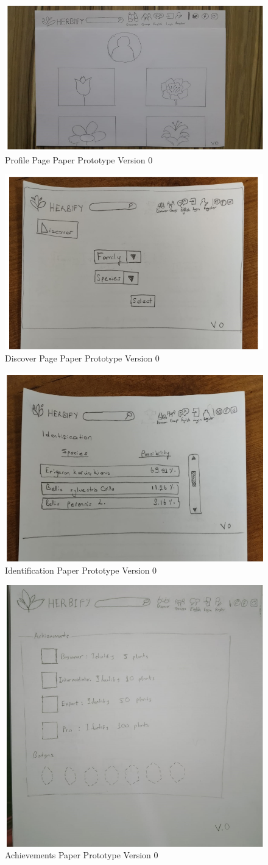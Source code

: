 \documentclass[conference]{IEEEtran}
\begin{document}
\begin{figure}[H]
\centerline{\includegraphics[width=0.48 \textwidth]{images/profile0.png}}
\caption{Profile Page Paper Prototype Version 0}
\label{fig:graph1}
\end{figure}

\begin{figure}[H]
\centerline{\includegraphics[width=0.48 \textwidth]{images/discover0.png}}
\caption{Discover Page Paper Prototype Version 0}
\label{fig:graph1}
\end{figure}


\begin{figure}[H]
\centerline{\includegraphics[width=0.48 \textwidth]{images/identification0.png}}
\caption{Identification Paper Prototype Version 0}
\label{fig:graph1}
\end{figure}


\begin{figure}[H]
\centerline{\includegraphics[width=0.48 \textwidth]{images/achivements.png}}
\caption{Achievements Paper Prototype Version 0}
\label{fig:graph1}
\end{figure}
\end{document}
